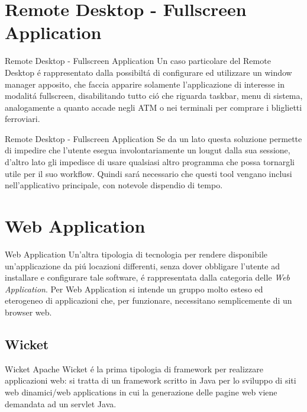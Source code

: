 \documentclass{beamer}
\begin{document}
\section{Remote Desktop - Fullscreen Application}
\begin{frame}{Remote Desktop - Fullscreen Application}
Un caso particolare del Remote Desktop \'e rappresentato dalla possibilt\'a di configurare ed utilizzare un window manager
 apposito, che faccia apparire solamente l'applicazione di interesse in modalit\'a fullscreen, disabilitando tutto ci\'o che riguarda
 taskbar, menu di sistema, analogamente a quanto accade negli ATM o nei terminali per comprare i bliglietti ferroviari.
\end{frame}



\begin{frame}{Remote Desktop - Fullscreen Application}
Se da un lato questa soluzione permette di impedire che l'utente esegua involontariamente un lougut dalla sua sessione, d'altro
lato gli impedisce di usare qualsiasi altro programma che possa tornargli utile per il suo workflow. Quindi sar\'a necessario che
questi tool vengano inclusi nell'applicativo principale, con notevole dispendio di tempo.
\end{frame}


\section{Web Application}
\begin{frame}{Web Application}
Un'altra tipologia di tecnologia per rendere disponibile un'applicazione da pi\'u locazioni differenti, senza dover obbligare l'utente
ad installare e configurare tale software, \'e rappresentata dalla categoria delle \emph{Web Application}.
Per Web Application si intende un gruppo molto esteso ed eterogeneo di applicazioni che, per funzionare, necessitano
semplicemente di un browser web.
\end{frame}


\subsection{Wicket}
\begin{frame}{Wicket}
Apache Wicket \'e la prima tipologia di framework per realizzare applicazioni web: si tratta di un framework scritto in Java per lo
sviluppo di siti web dinamici/web applications in cui la generazione delle pagine web viene demandata ad un servlet Java.
\end{frame}
\end{document}
